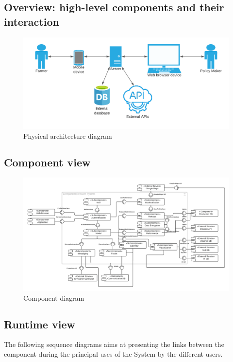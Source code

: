 \subsection{Overview: high-level components and their interaction}


\begin{figure} [!h]
	\centering
	\includegraphics[width=\textwidth]{Images/architecture-diagram.png}
	\caption{\label{fig:physical_diag} Physical architecture diagram}
\end{figure}


\subsection{Component view}
\begin{figure} [!h]
	\centering
	\includegraphics[width=\textwidth]{Images/component-diagram.png}
	\caption{\label{fig:component_diag} Component diagram}
\end{figure}

\subsection{Runtime view}
The following sequence diagrams aims at presenting the links between the component during the principal uses of the System by the different users.

